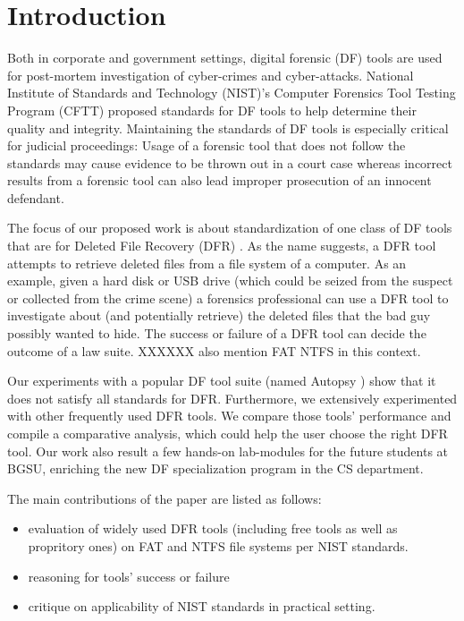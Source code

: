 
\section{Introduction}

Both in corporate and government settings, digital forensic (DF) tools are used for post-mortem investigation of cyber-crimes and cyber-attacks. 
National Institute of Standards and Technology (NIST)'s Computer Forensics Tool Testing Program (CFTT) \cite{cftt:nist} 
proposed standards for DF tools to help determine their quality and integrity. Maintaining the standards of DF tools 
is especially critical for judicial proceedings: Usage of a forensic tool that does not follow the standards may cause evidence to be thrown 
out in a court case whereas incorrect results from a forensic tool can also lead improper prosecution of an innocent defendant. 

The focus of our proposed work is about standardization of one class of DF 
tools that are for Deleted File Recovery (DFR) \cite{meta:dfr:standards}. As the name suggests, a DFR tool attempts to retrieve deleted files
from a file system of a computer. As an example, given a hard disk or USB drive (which could be seized from the suspect or collected from the crime scene) a 
forensics professional can use a DFR tool to investigate about (and potentially retrieve) the deleted files that 
the bad guy possibly wanted to hide. The success or failure of a DFR tool can decide the outcome of a law suite.  
XXXXXX also mention FAT NTFS in this context.

 
Our experiments with a popular DF tool suite (named Autopsy \cite{autopsy}) 
show that it does not satisfy all standards for DFR. 
Furthermore, we extensively experimented with other frequently used DFR tools. 
We compare those tools' performance and compile a comparative analysis, which could help the user choose the right DFR tool. 
Our work also result a few hands-on lab-modules for the future students at BGSU, enriching the new DF specialization program in the CS department.

The main contributions of the paper are listed as follows:
\begin{itemize}
\item evaluation of widely used DFR tools (including free tools as well as propritory ones) on FAT and NTFS file systems per NIST standards.
\item reasoning for tools' success or failure
\item critique on applicability of NIST standards in practical setting. 
\end{itemize}
